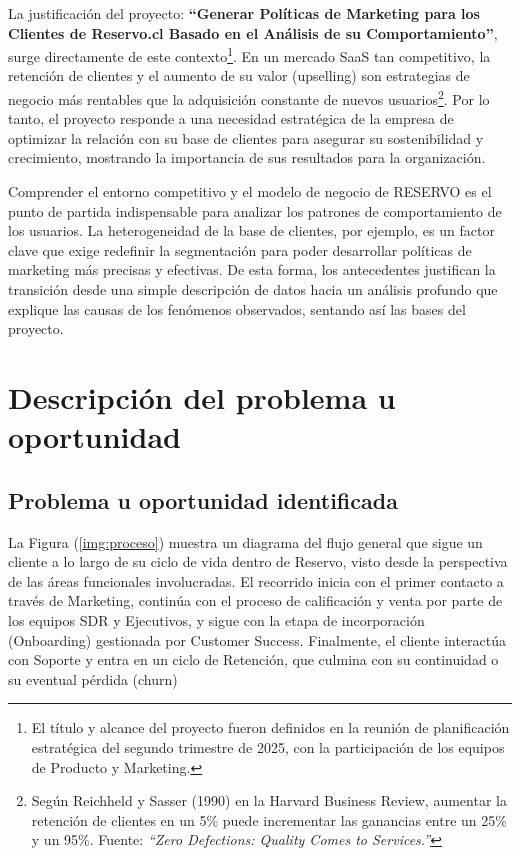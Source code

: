 La justificación del proyecto: \textbf{“Generar Políticas de Marketing para los Clientes de Reservo.cl Basado en el Análisis de su Comportamiento”}, surge directamente de este contexto\footnote{El título y alcance del proyecto fueron definidos en la reunión de planificación estratégica del segundo trimestre de 2025, con la participación de los equipos de Producto y Marketing.}. En un mercado SaaS tan competitivo, la retención de clientes y el aumento de su valor (upselling) son estrategias de negocio más rentables que la adquisición constante de nuevos usuarios\footnote{Según Reichheld y Sasser (1990) en la Harvard Business Review, aumentar la retención de clientes en un 5\% puede incrementar las ganancias entre un 25\% y un 95\%. Fuente: \textit{“Zero Defections: Quality Comes to Services.”}}. Por lo tanto, el proyecto responde a una necesidad estratégica de la empresa de optimizar la relación con su base de clientes para asegurar su sostenibilidad y crecimiento, mostrando la importancia de sus resultados para la organización.

Comprender el entorno competitivo y el modelo de negocio de RESERVO es el punto de partida indispensable para analizar los patrones de comportamiento de los usuarios. La heterogeneidad de la base de clientes, por ejemplo, es un factor clave que exige redefinir la segmentación para poder desarrollar políticas de marketing más precisas y efectivas. De esta forma, los antecedentes justifican la transición desde una simple descripción de datos hacia un análisis profundo que explique las causas de los fenómenos observados, sentando así las bases del proyecto.

\section{Descripción del problema u oportunidad}

\subsection{Problema u oportunidad identificada}


La Figura (\ref{img:proceso}) muestra un diagrama del flujo general que sigue un cliente a lo largo de su ciclo de vida dentro de Reservo, visto desde la perspectiva de las áreas funcionales involucradas. El recorrido inicia con el primer contacto a través de Marketing, continúa con el proceso de calificación y venta por parte de los equipos SDR y Ejecutivos, y sigue con la etapa de incorporación (Onboarding) gestionada por Customer Success. Finalmente, el cliente interactúa con Soporte y entra en un ciclo de Retención, que culmina con su continuidad o su eventual pérdida (churn)

